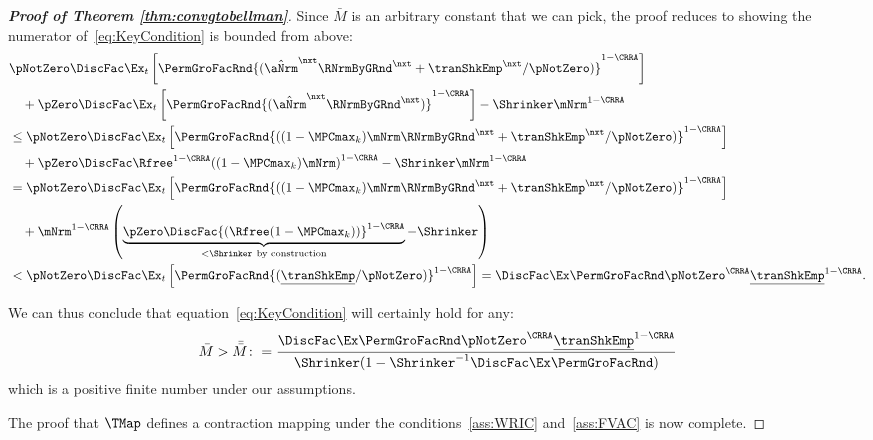 \documentclass[\econtexRoot/BufferStockTheory]{subfiles}
\begin{document}
\begin{proof}[\textbf{Proof of Theorem \ref{thm:convgtobellman}}]
Since $\bar{M}$ is an arbitrary constant that we can pick, the proof reduces to showing the numerator of~\eqref{eq:KeyCondition} is bounded from above:
%
%
\begin{equation}
\begin{aligned}
      &\pNotZero\DiscFac\Ex_{t}\left[\PermGroFacRnd{(\hat{\aNrm}^{\nxt}\RNrmByGRnd^{\nxt}+\tranShkEmp^{\nxt}/\pNotZero)}^{1-\CRRA}\right] \\
      &\quad +\pZero\DiscFac\Ex_{t}\left[\PermGroFacRnd{(\hat{\aNrm}^{\nxt}\RNrmByGRnd^{\nxt})}^{1-\CRRA}\right]-\Shrinker\mNrm^{1-\CRRA} \\
      &\leq \pNotZero\DiscFac\Ex_{t}\left[\PermGroFacRnd{((1-\MPCmax_{k})\mNrm\RNrmByGRnd^{\nxt}+\tranShkEmp^{\nxt}/\pNotZero)}^{1-\CRRA}\right] \\
      &\quad +\pZero\DiscFac\Rfree^{1-\CRRA}{((1-\MPCmax_{k})\mNrm)}^{1-\CRRA}- \Shrinker\mNrm^{1-\CRRA} \\
      &= \pNotZero\DiscFac\Ex_{t}\left[\PermGroFacRnd{((1-\MPCmax_{k})\mNrm\RNrmByGRnd^{\nxt}+\tranShkEmp^{\nxt}/\pNotZero)}^{1-\CRRA}\right] \\
      &\quad +\mNrm^{1-\CRRA}\left(\underbrace{\pZero \DiscFac {(\Rfree (1-\MPCmax_{k}))}^{1-\CRRA}}_{<\Shrinker ~\text{by construction}}-\Shrinker \right) \\
      &< \pNotZero\DiscFac\Ex_{t}\left[\PermGroFacRnd{(\underline{\tranShkEmp}/\pNotZero)}^{1-\CRRA}\right]=\DiscFac\Ex \PermGroFacRnd\pNotZero^{\CRRA}\underline{\tranShkEmp}^{1-\CRRA} .
\end{aligned}
\end{equation}
    
%
%

We can thus conclude that equation~\eqref{eq:KeyCondition} will certainly hold for any:
\begin{equation}\begin{gathered}\begin{aligned}
      \bar{M}>\bar{\bar{M}}\colon =\frac{\DiscFac \Ex \PermGroFacRnd\pNotZero^{\CRRA}\underline{\tranShkEmp}^{1-\CRRA}}{\Shrinker(1- \Shrinker^{-1}\DiscFac \Ex \PermGroFacRnd)}
    \end{aligned}\end{gathered}\end{equation}
which is a positive finite number under our assumptions.

The proof that $\TMap$ defines a contraction mapping under the
conditions~\ref{ass:WRIC} and~\eqref{ass:FVAC} is
now complete.


\end{proof}
\end{document}

